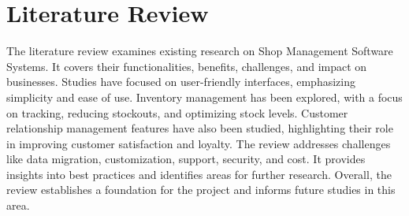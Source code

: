 \section{Literature Review}
The literature review examines existing research on Shop Management Software Systems. It covers their functionalities, benefits, challenges, and impact on businesses. Studies have focused on user-friendly interfaces, emphasizing simplicity and ease of use. Inventory management has been explored, with a focus on tracking, reducing stockouts, and optimizing stock levels. Customer relationship management features have also been studied, highlighting their role in improving customer satisfaction and loyalty. The review addresses challenges like data migration, customization, support, security, and cost. It provides insights into best practices and identifies areas for further research. Overall, the review establishes a foundation for the project and informs future studies in this area.
